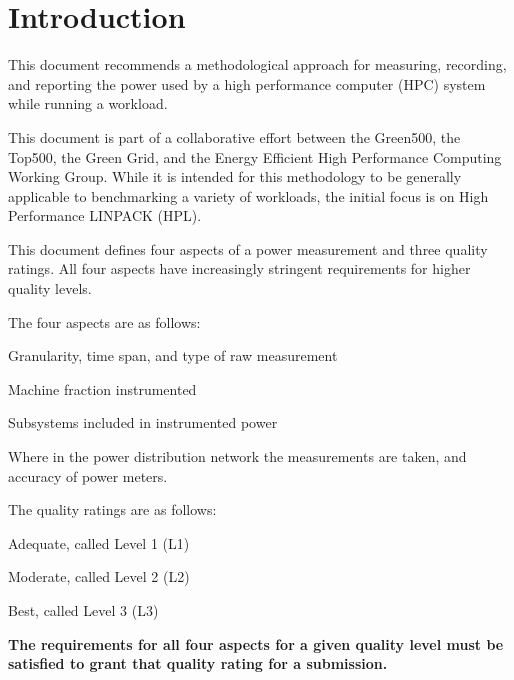\chapter{Introduction}
\label{sec:intro}

\noindent
This document recommends a methodological approach for measuring, recording, and reporting the power used by a high performance 
computer (HPC) system while
running a workload. 
\wl

\noindent
This document is part of a collaborative effort between the Green500, the Top500, 
the Green Grid, and the Energy Efficient High Performance Computing Working Group.  While 
it is intended for this methodology to be generally applicable to benchmarking a variety of 
workloads, the initial focus is on High Performance LINPACK (HPL). 
\wl

\noindent
This document defines four aspects of a power measurement and three quality ratings. All 
four aspects have increasingly stringent requirements for higher quality levels.  
\wl

\noindent
The four aspects are as follows:

\begin{packed_enum}
\item 
Granularity, time span, and type of raw measurement
\item 
Machine fraction instrumented
\item 
Subsystems included in instrumented power
\item 
Where in the power distribution network the measurements are taken, and accuracy of power meters.
\end{packed_enum}

\noindent
The quality ratings are as follows:

\begin{packed_item}
\item 
Adequate, called Level 1 (L1)
\item
Moderate, called Level 2 (L2)
\item
Best, called Level 3 (L3)
\end{packed_item}

\noindent
\textbf{The requirements for all four aspects for a given quality level must be satisfied to grant that quality rating for a submission.}
\wl
